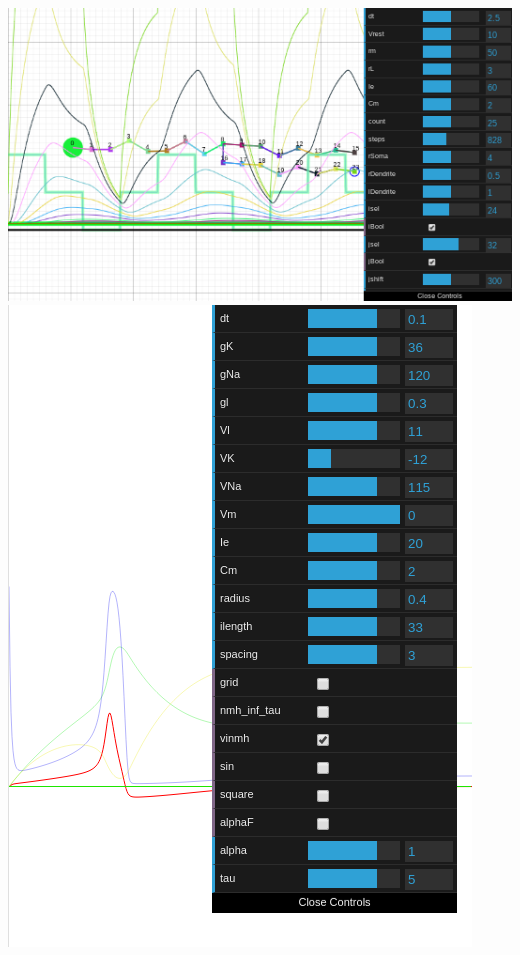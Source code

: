 \documentclass[../r.tex]{subfiles}
\begin{document}
\href{https://github.com/randompast/multicompartmentalModel}{\includegraphics[scale=0.4]{../scientific/mcm.png}}
\includegraphics[scale=0.2]{../scientific/initial.png} 
\end{document}
